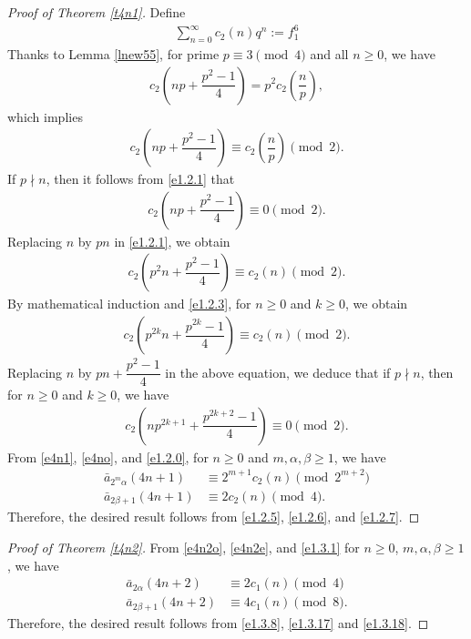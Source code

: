 \documentclass[11pt,a4paper]{article}
\numberwithin{equation}{section}
\theoremstyle{plain}
\begin{document}
\begin{proof}[Proof of Theorem \ref{t4n1}\unskip]
	Define
	\begin{align}\label{e1.2.0}
		\sum_{n=0}^{\infty}c_2(n)q^n:=f_1^6
	\end{align}
	Thanks to Lemma \ref{lnew55}, for prime $p\equiv 3\pmod 4$ and all $n\ge 0$, we have
	\begin{align*}
		c_2\left(np+\dfrac{p^2-1}{4}\right)=p^2c_2\left(\dfrac{n}{p}\right),
	\end{align*}
	which implies
	\begin{align}\label{e1.2.1}
		c_2\left(np+\dfrac{p^2-1}{4}\right)\equiv c_2\left(\dfrac{n}{p}\right)\pmod 2.
	\end{align}
	If $p\nmid n$, then it follows from \eqref{e1.2.1} that
	\begin{align}\label{e1.2.2}
		c_2\left(np+\dfrac{p^2-1}{4}\right)\equiv 0\pmod 2.
	\end{align}
	Replacing $n$ by $pn$ in \eqref{e1.2.1}, we obtain
	\begin{align}\label{e1.2.3}
		c_2\left(p^2n+\dfrac{p^2-1}{4}\right)\equiv c_2(n)\pmod 2.
	\end{align}
	By mathematical induction and \eqref{e1.2.3}, for $n\ge 0$ and $k\ge0$, we obtain
	\begin{align}\label{e1.2.4}
		c_2\left(p^{2k}n+\dfrac{p^{2k}-1}{4}\right)\equiv c_2(n)\pmod 2.
	\end{align}
	Replacing $n$ by $pn+\dfrac{p^2-1}{4}$ in the above equation, we deduce that if $p\nmid n$, then for $n\ge 0$ and $k\ge 0$, we have
	\begin{align}\label{e1.2.5}
		c_2\left(np^{2k+1}+\dfrac{p^{2k+2}-1}{4}\right)\equiv 0\pmod 2.
	\end{align}
	From \eqref{e4n1}, \eqref{e4no}, and  \eqref{e1.2.0}, for $n\ge0$ and $m,\alpha,\beta\ge 1$, we have
	\begin{align}
		\bar{a}_{2^m\alpha}(4n+1)&\equiv 2^{m+1}c_2(n)\pmod{2^{m+2}}\label{e1.2.6}\\
		\bar{a}_{2\beta+1}(4n+1)&\equiv 2c_2(n)\pmod 4.\label{e1.2.7}
	\end{align}
	Therefore, the desired result follows from \eqref{e1.2.5}, \eqref{e1.2.6}, and \eqref{e1.2.7}.
\end{proof}
\begin{proof}[Proof of Theorem \ref{t4n2}\unskip]
	From \eqref{e4n2o}, \eqref{e4n2e}, and \eqref{e1.3.1} for $n\ge 0$, $m,\alpha,\beta\ge 1$, we have
	\begin{align}
		\bar{a}_{2\alpha}(4n+2)&\equiv 2c_1(n)\pmod{4}\label{e1.3.17}\\
		\bar{a}_{2\beta+1}(4n+2)&\equiv 4c_1(n)\pmod 8.\label{e1.3.18}
	\end{align}
	Therefore, the desired result follows from \eqref{e1.3.8}, \eqref{e1.3.17} and \eqref{e1.3.18}.
\end{proof}
\end{document}
